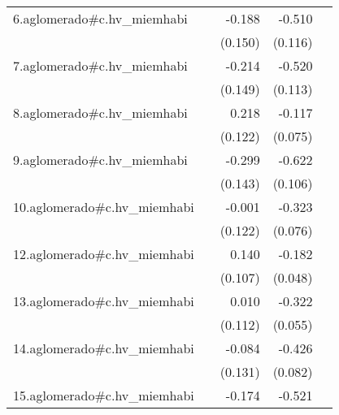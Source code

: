 {\begin{longtable}{l*{4}{D{.}{.}{-1}}}
\addlinespace
6.aglomerado#c.hv\_miemhabi&                     &      -0.188         &      -0.510\sym{***}&                     \\
            &                     &     (0.150)         &     (0.116)         &                     \\
\addlinespace
7.aglomerado#c.hv\_miemhabi&                     &      -0.214         &      -0.520\sym{***}&                     \\
            &                     &     (0.149)         &     (0.113)         &                     \\
\addlinespace
8.aglomerado#c.hv\_miemhabi&                     &       0.218         &      -0.117         &                     \\
            &                     &     (0.122)         &     (0.075)         &                     \\
\addlinespace
9.aglomerado#c.hv\_miemhabi&                     &      -0.299\sym{*}  &      -0.622\sym{***}&                     \\
            &                     &     (0.143)         &     (0.106)         &                     \\
\addlinespace
10.aglomerado#c.hv\_miemhabi&                     &      -0.001         &      -0.323\sym{***}&                     \\
            &                     &     (0.122)         &     (0.076)         &                     \\
\addlinespace
12.aglomerado#c.hv\_miemhabi&                     &       0.140         &      -0.182\sym{***}&                     \\
            &                     &     (0.107)         &     (0.048)         &                     \\
\addlinespace
13.aglomerado#c.hv\_miemhabi&                     &       0.010         &      -0.322\sym{***}&                     \\
            &                     &     (0.112)         &     (0.055)         &                     \\
\addlinespace
14.aglomerado#c.hv\_miemhabi&                     &      -0.084         &      -0.426\sym{***}&                     \\
            &                     &     (0.131)         &     (0.082)         &                     \\
\addlinespace
15.aglomerado#c.hv\_miemhabi&                     &      -0.174         &      -0.521\sym{***}&                     \\

\end{longtable}}
